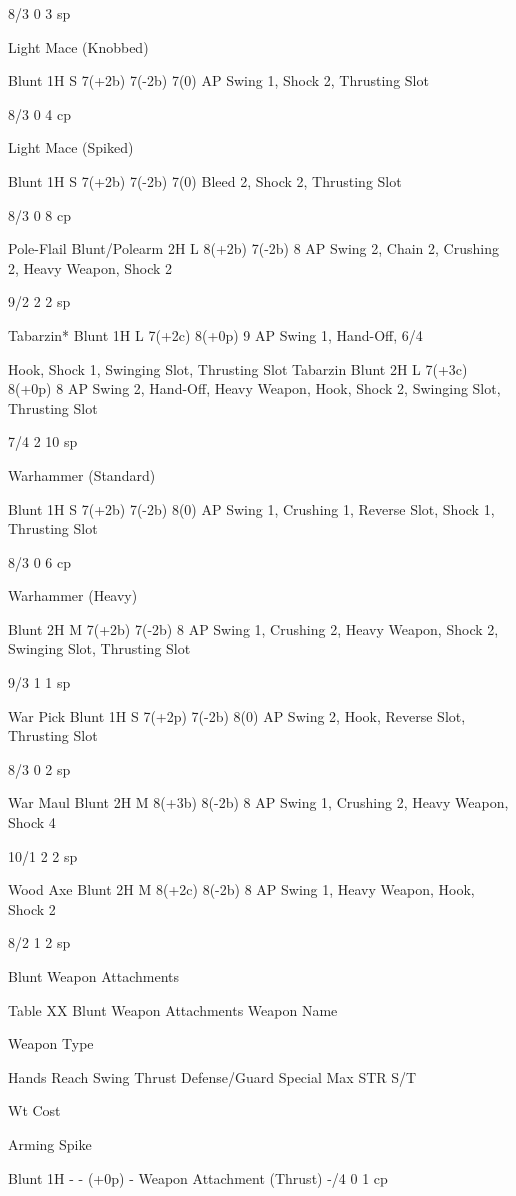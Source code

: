 \documentclass[oneside,11pt,english]{book}
\begin{document}
8/3 0 3 sp 

Light Mace 
(Knobbed) 

Blunt 1H S 7(+2b) 7(-2b) 7(0) AP Swing 1, Shock 2, 
Thrusting Slot 

8/3 0 4 cp 

Light Mace 
(Spiked) 

Blunt 1H S 7(+2b) 7(-2b) 7(0) Bleed 2, Shock 2, 
Thrusting Slot 

8/3 0 8 cp 

Pole-Flail Blunt/Polearm 2H L 8(+2b) 7(-2b) 8 AP Swing 2, Chain 2, 
Crushing 2, Heavy 
Weapon, Shock 2 

9/2 2 2 sp 

Tabarzin* Blunt 1H L 7(+2c) 8(+0p) 9 AP Swing 1, Hand-Off, 6/4 


Hook, Shock 1, 
Swinging Slot, 
Thrusting Slot 
Tabarzin Blunt 2H L 7(+3c) 8(+0p) 8 AP Swing 2, Hand-Off, 
Heavy Weapon, Hook, 
Shock 2, Swinging Slot, 
Thrusting Slot 

7/4 2 10 
sp 

Warhammer 
(Standard) 

Blunt 1H S 7(+2b) 7(-2b) 8(0) AP Swing 1, Crushing 
1, Reverse Slot, Shock 
1, Thrusting Slot 

8/3 0 6 cp 

Warhammer 
(Heavy) 

Blunt 2H M 7(+2b) 7(-2b) 8 AP Swing 1, Crushing 
2, Heavy Weapon, 
Shock 2, Swinging Slot, 
Thrusting Slot 

9/3 1 1 sp 

War Pick Blunt 1H S 7(+2p) 7(-2b) 8(0) AP Swing 2, Hook, 
Reverse Slot, Thrusting 
Slot 

8/3 0 2 sp 

War Maul Blunt 2H M 8(+3b) 8(-2b) 8 AP Swing 1, Crushing 
2, Heavy Weapon, 
Shock 4 

10/1 2 2 sp 

Wood Axe Blunt 2H M 8(+2c) 8(-2b) 8 AP Swing 1, Heavy 
Weapon, Hook, Shock 2 

8/2 1 2 sp 

 
Blunt Weapon Attachments 

 
Table XX Blunt Weapon Attachments 
Weapon 
Name 

Weapon 
Type 

Hands Reach Swing Thrust Defense/Guard Special Max 
STR 
S/T 

Wt Cost 

Arming 
Spike 

Blunt 1H - - (+0p) - Weapon Attachment (Thrust) -/4 0 1 cp 
\end{document}
